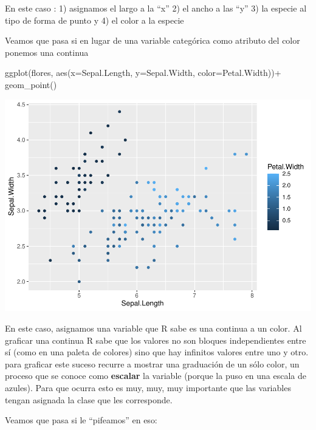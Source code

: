 \documentclass[
]{book}
\newenvironment{Shaded}{\begin{snugshade}}{\end{snugshade}}
\newcommand{\AttributeTok}[1]{\textcolor[rgb]{0.77,0.63,0.00}{#1}}
\newcommand{\CommentTok}[1]{\textcolor[rgb]{0.56,0.35,0.01}{\textit{#1}}}
\newcommand{\FunctionTok}[1]{\textcolor[rgb]{0.00,0.00,0.00}{#1}}
\newcommand{\NormalTok}[1]{#1}
\newcommand{\OtherTok}[1]{\textcolor[rgb]{0.56,0.35,0.01}{#1}}
\newcommand{\SpecialCharTok}[1]{\textcolor[rgb]{0.00,0.00,0.00}{#1}}
\begin{document}
En este caso : 1) asignamos el largo a la ``x'' 2) el ancho a las ``y'' 3) la especie al tipo de forma de punto y 4) el color a la especie

Veamos que pasa si en lugar de una variable categórica como atributo del color ponemos una continua

\begin{Shaded}
\begin{Highlighting}[]
\FunctionTok{ggplot}\NormalTok{(flores, }\FunctionTok{aes}\NormalTok{(}\AttributeTok{x=}\NormalTok{Sepal.Length, }\AttributeTok{y=}\NormalTok{Sepal.Width, }\AttributeTok{color=}\NormalTok{Petal.Width))}\SpecialCharTok{+}
  \FunctionTok{geom\_point}\NormalTok{()}
\end{Highlighting}
\end{Shaded}

\includegraphics{Esatadistica_en_R_files/figure-latex/unnamed-chunk-146-1.pdf}

En este caso, asignamos una variable que R sabe es una continua a un color. Al graficar una continua R sabe que los valores no son bloques independientes entre sí (como en una paleta de colores) sino que hay infinitos valores entre uno y otro. para graficar este suceso recurre a mostrar una graduación de un sólo color, un proceso que se conoce como \textbf{escalar} la variable (porque la puso en una escala de azules). Para que ocurra esto es muy, muy, muy importante que las variables tengan asignada la clase que les corresponde.

Veamos que pasa si le ``pifeamos'' en eso:

\begin{Shaded}
\end{Shaded}
\end{document}
